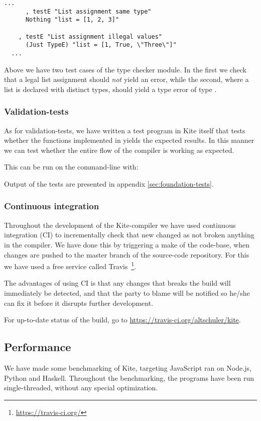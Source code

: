 \begin{lstlisting}[caption=\code{Kite.Test.TypeCheck.hs} snippet]
  ...
      , testE "List assignment same type"
      Nothing "list = [1, 2, 3]"

    , testE "List assignment illegal values"
      (Just TypeE) "list = [1, True, \"Three\"]"
  ...
\end{lstlisting}

Above we have two test cases of the type checker module. In the first we check that a legal list assignment should \emph{not} yield an error, while the second, where a list is declared with distinct types, should yield a type error of type .

\subsubsection{Validation-tests}

As for validation-tests, we have written a test program in Kite itself that tests whether the functions implemented in  yields the expected results. In this manner we can test whether the entire flow of the compiler is working as expected.

This can be run on the command-line with:


Output of the tests are presented in appendix \ref{sec:foundation-tests}.

\subsubsection{Continuous integration}
Throughout the development of the Kite-compiler we have used continuous integration (CI) to incrementally check that new changed as not broken anything in the compiler. We have done this by triggering a make of the code-base, when changes are pushed to the master branch of the source-code repository. For this we have used a free service called Travis~\footnote{\url{https://travis-ci.org/}}.

The advantages of using CI is that any changes that breaks the build will immediately be detected, and that the party to blame will be notified so he/she can fix it before it disrupts further development.

For up-to-date status of the build, go to \url{https://travis-ci.org/altschuler/kite}.


\subsection{Performance}
We have made some benchmarking of Kite, targeting JavaScript ran on Node.js, Python and Haskell. Throughout the benchmarking, the programs have been run single-threaded, without any special optimization.

